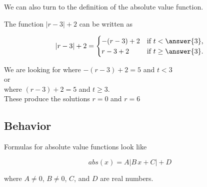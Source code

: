 \documentclass{ximera}
\begin{document}
\begin{example}
\begin{image}
\end{image}



We can also turn to the definition of the absolute value function.


The function $|r-3| + 2$ can be written as 



\[
|r-3| + 2 = 
\begin{cases}
  -(r-3) + 2  & \text{if $t<\answer{3}$,}\\
   r-3 + 2  & \text{if $t\ge \answer{3}$}.
\end{cases}
\]


We are looking for where $-(r-3) + 2 = 5$ and $ t < 3$  \\

or \\

where $(r-3) + 2 = 5$ and $t \ge 3$.  \\


These produce the solutions $r=0$ and $r=6$










\end{example}






\subsection*{Behavior}



Formulas for absolute value functions look like

\[     abs(x) =    A  | B \, x + C | + D           \]

where $A \ne 0$, $B \ne 0$, $C$, and $D$ are real numbers.
\end{document}
